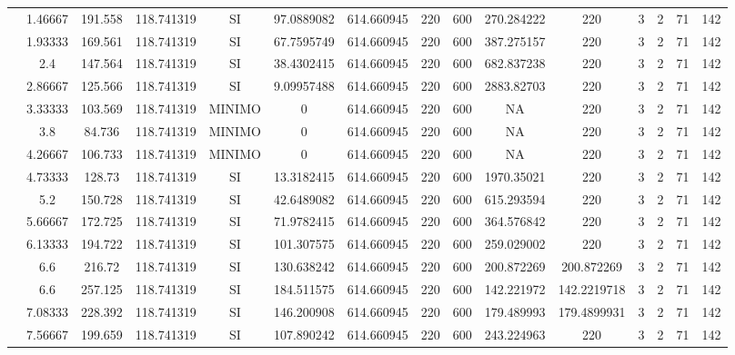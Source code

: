 \begin{table}[H]
{\begin{tabular}{|c|c|c|c|c|c|c|c|c|c|c|c|c|c|c|}
\cline{2-15}    & 1.46667 & 191.558 & 118.741319 & SI  & 97.0889082 & 614.660945 & 220 & 600 & 270.284222 & 220 & 3   & 2   & 71  & 142 \bigstrut\\
\cline{2-15}    & 1.93333 & 169.561 & 118.741319 & SI  & 67.7595749 & 614.660945 & 220 & 600 & 387.275157 & 220 & 3   & 2   & 71  & 142 \bigstrut\\
\cline{2-15}    & 2.4 & 147.564 & 118.741319 & SI  & 38.4302415 & 614.660945 & 220 & 600 & 682.837238 & 220 & 3   & 2   & 71  & 142 \bigstrut\\
\cline{2-15}    & 2.86667 & 125.566 & 118.741319 & SI  & 9.09957488 & 614.660945 & 220 & 600 & 2883.82703 & 220 & 3   & 2   & 71  & 142 \bigstrut\\
\cline{2-15}    & 3.33333 & 103.569 & 118.741319 & MINIMO & 0   & 614.660945 & 220 & 600 & NA  & 220 & 3   & 2   & 71  & 142 \bigstrut\\
\cline{2-15}    & 3.8 & 84.736 & 118.741319 & MINIMO & 0   & 614.660945 & 220 & 600 & NA  & 220 & 3   & 2   & 71  & 142 \bigstrut\\
\cline{2-15}    & 4.26667 & 106.733 & 118.741319 & MINIMO & 0   & 614.660945 & 220 & 600 & NA  & 220 & 3   & 2   & 71  & 142 \bigstrut\\
\cline{2-15}    & 4.73333 & 128.73 & 118.741319 & SI  & 13.3182415 & 614.660945 & 220 & 600 & 1970.35021 & 220 & 3   & 2   & 71  & 142 \bigstrut\\
\cline{2-15}    & 5.2 & 150.728 & 118.741319 & SI  & 42.6489082 & 614.660945 & 220 & 600 & 615.293594 & 220 & 3   & 2   & 71  & 142 \bigstrut\\
\cline{2-15}    & 5.66667 & 172.725 & 118.741319 & SI  & 71.9782415 & 614.660945 & 220 & 600 & 364.576842 & 220 & 3   & 2   & 71  & 142 \bigstrut\\
\cline{2-15}    & 6.13333 & 194.722 & 118.741319 & SI  & 101.307575 & 614.660945 & 220 & 600 & 259.029002 & 220 & 3   & 2   & 71  & 142 \bigstrut\\
\cline{2-15}    & 6.6 & 216.72 & 118.741319 & SI  & 130.638242 & 614.660945 & 220 & 600 & 200.872269 & 200.872269 & 3   & 2   & 71  & 142 \bigstrut\\
\cline{2-15}    & 6.6 & 257.125 & 118.741319 & SI  & 184.511575 & 614.660945 & 220 & 600 & 142.221972 & 142.2219718 & 3   & 2   & 71  & 142 \bigstrut\\
\cline{2-15}    & 7.08333 & 228.392 & 118.741319 & SI  & 146.200908 & 614.660945 & 220 & 600 & 179.489993 & 179.4899931 & 3   & 2   & 71  & 142 \bigstrut\\
\cline{2-15}    & 7.56667 & 199.659 & 118.741319 & SI  & 107.890242 & 614.660945 & 220 & 600 & 243.224963 & 220 & 3   & 2   & 71  & 142 \bigstrut\\

\end{tabular}}
\end{table}
